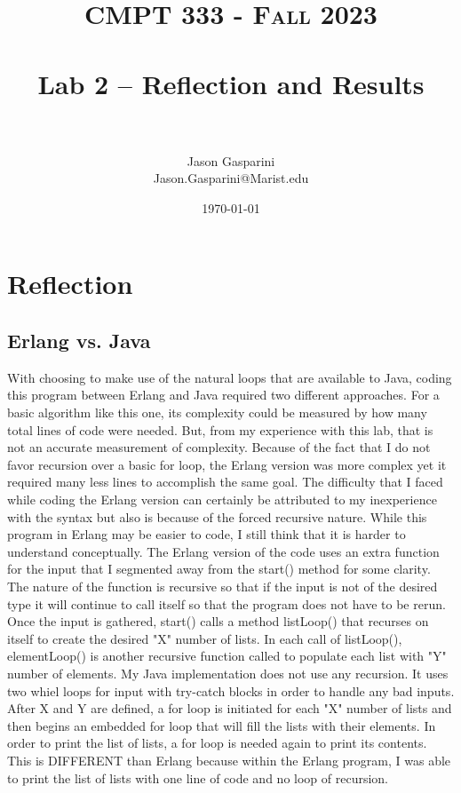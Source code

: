 \documentclass[letterpaper, 10pt]{article}
\title{	
   \normalfont \normalsize 
   \textsc{CMPT 333 - Fall 2023 } \\[10pt] %
   \horrule{0.5pt} \\[0.25cm] 	%
   \huge Lab 2 -- Reflection and Results \\     	    %
   \horrule{0.5pt} \\[0.25cm] 	%
}
\author{Jason Gasparini \\ \normalsize Jason.Gasparini@Marist.edu}
\date{\normalsize\today} 	%
\begin{document}
\maketitle %



\section{Reflection}
\vspace{1em}

\subsection{Erlang vs. Java}

With choosing to make use of the natural loops that are available to Java, coding this program between Erlang and Java required two different approaches. For a basic algorithm like this one, its complexity could be measured by how many total lines of code were needed. But, from my experience with this lab, that is not an accurate measurement of complexity. Because of the fact that I do not favor recursion over a basic for loop, the Erlang version was more complex yet it required many less lines to accomplish the same goal. The difficulty that I faced while coding the Erlang version can certainly be attributed to my inexperience with the syntax but also is because of the forced recursive nature. While this program in Erlang may be easier to code, I still think that it is harder to understand conceptually.
\vspace{1em}
The Erlang version of the code uses an extra function for the input that I segmented away from the start() method for some clarity. The nature of the function is recursive so that if the input is not of the desired type it will continue to call itself so that the program does not have to be rerun. Once the input is gathered, start() calls a method listLoop() that recurses on itself to create the desired "X" number of lists. In each call of listLoop(), elementLoop() is another recursive function called to populate each list with "Y" number of elements.
My Java implementation does not use any recursion. It uses two whiel loops for input with try-catch blocks in order to handle any bad inputs. After X and Y are defined, a for loop is initiated for each "X" number of lists and then begins an embedded for loop that will fill the lists with their elements. In order to print the list of lists, a for loop is needed again to print its contents. This is DIFFERENT than Erlang because within the Erlang program, I was able to print the list of lists with one line of code and no loop of recursion.
\vspace{1em}
\end{document}
